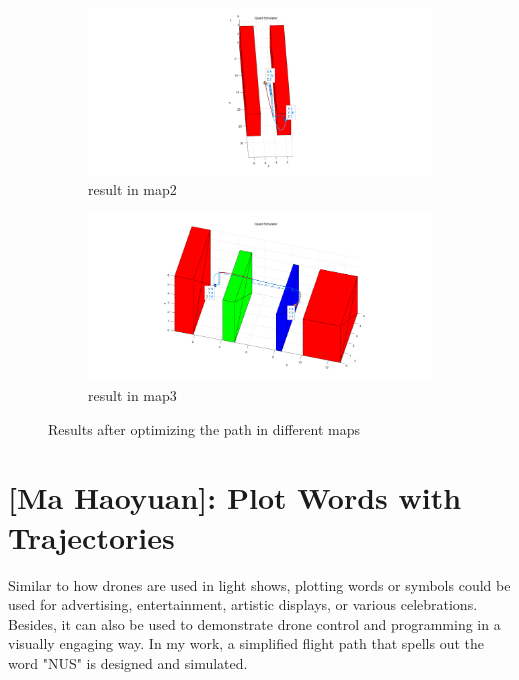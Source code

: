 \documentclass[12pt]{article}
\begin{document}
\begin{figure}[H]
    \centering
    \begin{subfigure}{.45\textwidth}
        \centering
        \includegraphics[width=\linewidth]{figures/map2}
        \caption{result in map2}
        \label{fig:optimized_path_map2}
    \end{subfigure}
    \hspace{.05\textwidth}  %
    \begin{subfigure}{.45\textwidth}
        \centering
        \includegraphics[width=\linewidth]{figures/map3}
        \caption{result in map3}
        \label{fig:optimized_path_map3}
    \end{subfigure}
    \caption{Results after optimizing the path in different maps}
    \label{fig:optimized_path_maps}
\end{figure}

\section{[Ma Haoyuan]: Plot Words with Trajectories}


Similar to how drones are used in light shows, plotting words or symbols could be used for advertising, entertainment, artistic displays, or various celebrations.
Besides, it can also be used to demonstrate drone control and programming in a visually engaging way.
In my work, a simplified flight path that spells out the word "NUS" is designed and simulated.
\end{document}
